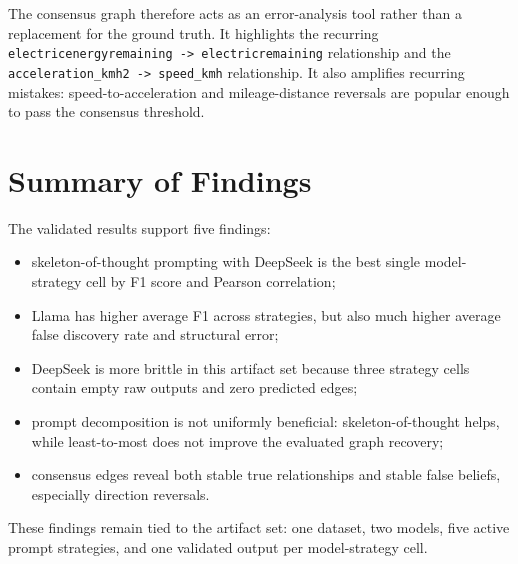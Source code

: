 The consensus graph therefore acts as an error-analysis tool rather than a
replacement for the ground truth. It highlights the recurring
\texttt{electricenergyremaining -> electricremaining} relationship and the
\texttt{acceleration\_kmh2 -> speed\_kmh} relationship. It also amplifies
recurring mistakes: speed-to-acceleration and mileage-distance reversals are
popular enough to pass the consensus threshold.

\section{Summary of Findings}

The validated results support five findings:

\begin{itemize}
  \item skeleton-of-thought prompting with DeepSeek is the best single
  model-strategy cell by F1 score and Pearson correlation;
  \item Llama has higher average F1 across strategies, but also much higher
  average false discovery rate and structural error;
  \item DeepSeek is more brittle in this artifact set because three strategy
  cells contain empty raw outputs and zero predicted edges;
  \item prompt decomposition is not uniformly beneficial: skeleton-of-thought
  helps, while least-to-most does not improve the evaluated graph recovery;
  \item consensus edges reveal both stable true relationships and stable false
  beliefs, especially direction reversals.
\end{itemize}

These findings remain tied to the artifact set: one dataset, two models,
five active prompt strategies, and one validated output per model-strategy
cell.
